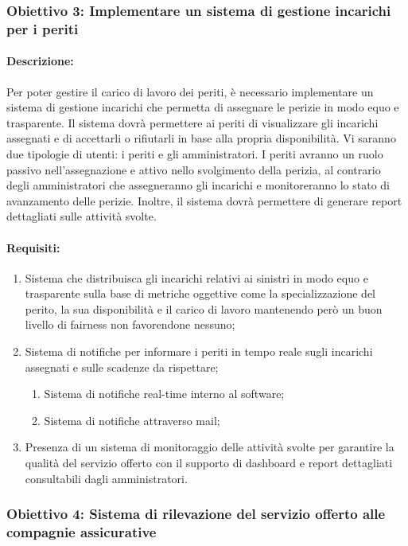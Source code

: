 \documentclass[a4paper,12pt, openright]{report}
\begin{document}
\subsubsection{Obiettivo 3: Implementare un sistema di gestione incarichi per i periti}

\paragraph{Descrizione:}
Per poter gestire il carico di lavoro dei periti, è necessario implementare un sistema di gestione incarichi che permetta di assegnare le perizie in modo equo e trasparente. Il sistema dovrà permettere ai periti di visualizzare gli incarichi assegnati e di accettarli o rifiutarli in base alla propria disponibilità. 
Vi saranno due tipologie di utenti: i periti e gli amministratori. I periti avranno un ruolo passivo nell'assegnazione e attivo nello svolgimento della perizia, al contrario degli amministratori che assegneranno gli incarichi e monitoreranno lo stato di avanzamento delle perizie.
Inoltre, il sistema dovrà permettere di generare report dettagliati sulle attività svolte.

\paragraph{Requisiti:}
\begin{enumerate}
    \item Sistema che distribuisca gli incarichi relativi ai sinistri in modo equo e trasparente sulla base di metriche oggettive come la specializzazione del perito, la sua disponibilità e il carico di lavoro mantenendo però un buon livello di fairness non favorendone nessuno;
    \item Sistema di notifiche per informare i periti in tempo reale sugli incarichi assegnati e sulle scadenze da rispettare;
    \begin{enumerate}
        \item Sistema di notifiche real-time interno al software;
        \item Sistema di notifiche attraverso mail;
    \end{enumerate}
    \item Presenza di un sistema di monitoraggio delle attività svolte per garantire la qualità del servizio offerto con il supporto di dashboard e report dettagliati consultabili dagli amministratori.
\end{enumerate}

\subsubsection{Obiettivo 4: Sistema di rilevazione del servizio offerto alle compagnie assicurative}
\end{document}
